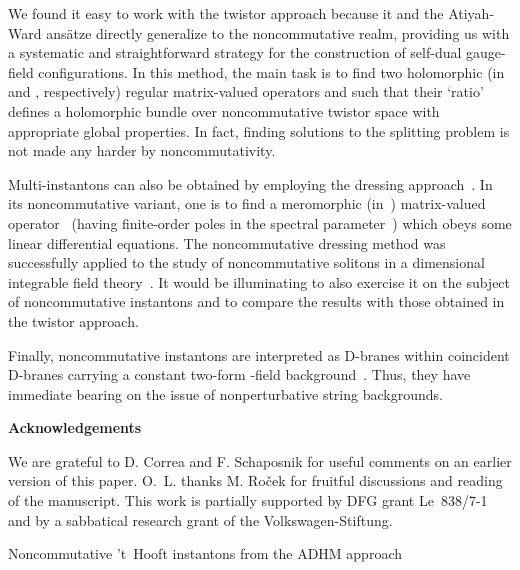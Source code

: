 \documentclass[a4paper,11pt]{article}
\makeatletter
\renewcommand{\section}{\@startsection{section}{1}{0pt}{\medskipamount}
{\medskipamount}{\large\bf}}
\numberwithin{equation}{section}
\def\l{\lambda}
\makeatother
\begin{document}
{We found it easy to work with the twistor approach
because it and the Atiyah-Ward ans\"atze directly generalize 
to the noncommutative realm, providing us with a systematic
and straightforward strategy for the construction of
self-dual gauge-field configurations. In this method, the main task is to find 
two holomorphic (in~\myHighlight{$\l$}\coordHE{} and \myHighlight{$\tilde\l$}\coordHE{}, respectively)
regular matrix-valued operators \myHighlight{$\psi_+$}\coordHE{} and \myHighlight{$\psi_-$}\coordHE{} such that 
their `ratio'~\coordHE{}
defines a holomorphic bundle over noncommutative twistor space 
with appropriate global properties.
In fact, finding solutions to the splitting problem is not
made any harder by noncommutativity.

Multi-instantons can also be obtained by employing the dressing
approach~\cite{Belavin:1978pa, Forgacs:1981su}. 
In its noncommutative variant,
one is to find a meromorphic (in~\myHighlight{$\l$}\coordHE{}) matrix-valued operator~\myHighlight{$\psi$}\coordHE{}
(having finite-order poles in the spectral parameter~\myHighlight{$\l$}\coordHE{}) which
obeys some linear differential equations.
The noncommutative dressing method was successfully applied
to the study of noncommutative solitons in a \coordHE{} dimensional
integrable field theory~\cite{Lechtenfeld:2001uq,Lechtenfeld:2001aw}.
It would be illuminating to also exercise it on the subject of
noncommutative instantons and to compare the results
with those obtained in the twistor approach.

{}Finally, noncommutative instantons are interpreted as
D\coordHE{}-branes within coincident D\coordHE{}-branes carrying a
constant two-form \coordHE{}-field background~\cite{Seiberg:1999vs}. 
Thus, they have immediate bearing on the issue of 
nonperturbative string backgrounds.

\vfill\eject
\noindent
{\large{\bf Acknowledgements}}

\smallskip
\noindent
We are grateful to D. Correa and F. Schaposnik for useful comments on
an earlier version of this paper.
O.~L. thanks M. Ro\v cek for fruitful discussions 
and reading of the manuscript.
This work is partially supported by DFG grant Le~838/7-1
and by a sabbatical research grant of the Volkswagen-Stiftung.

\bigskip

\setcounter{section}{0}
\renewcommand{\thesection}{\Alph{section}}
\section{Noncommutative 't~Hooft instantons from the ADHM approach}

}
\end{document}
